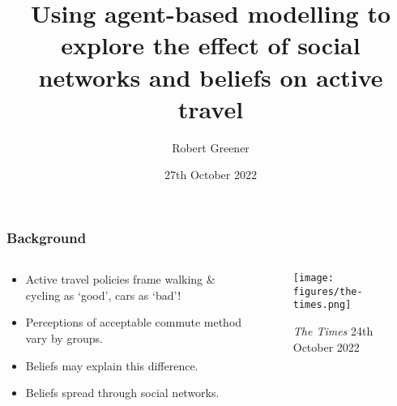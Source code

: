 \documentclass[aspectratio=169]{beamer}
\title{Using agent-based modelling to explore the effect of social networks and beliefs on active travel}
\author{Robert Greener}
\institute{London School of Hygiene and Tropical Medicine}
\date{27th October 2022}
\begin{document}
\maketitle

\begin{frame}
    \frametitle{Background}
    \begin{columns}
        \begin{column}{0.5\textwidth}
            \begin{itemize}
                \item Active travel policies frame walking \& cycling as `good', cars as `bad'!
                \item Perceptions of acceptable commute method vary by groups.
                \item Beliefs may explain this difference.
                \item Beliefs spread through social networks.
            \end{itemize}
        \end{column}
        \begin{column}{0.5\textwidth}
            \begin{figure}[H]
                \texttt{[image: figures/the-times.png]}
                \caption{\emph{The Times} 24th October 2022}
            \end{figure}
        \end{column}
    \end{columns}
\end{frame}
\end{document}
